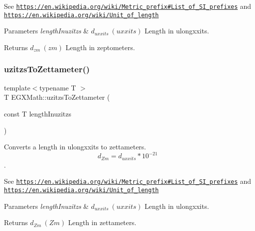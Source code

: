 See \href{https://en.wikipedia.org/wiki/Metric_prefix#List_of_SI_prefixes}{\tt https\+://en.\+wikipedia.\+org/wiki/\+Metric\+\_\+prefix\#\+List\+\_\+of\+\_\+\+S\+I\+\_\+prefixes} and \href{https://en.wikipedia.org/wiki/Unit_of_length}{\tt https\+://en.\+wikipedia.\+org/wiki/\+Unit\+\_\+of\+\_\+length} 
\begin{DoxyParams}{Parameters}
{\em length\+Inuzitzs} & $ d_{uxxits}\ (uxxits)$ Length in ulongxxits. \\
\hline
\end{DoxyParams}
\begin{DoxyReturn}{Returns}
$ d_{zm}\ (zm)$ Length in zeptometers. 
\end{DoxyReturn}
\mbox{\label{group___e_g_x_math-_conversions-_length_conversions-uzitzs-_s_i_ga43f793911855da08c6649eb9b059d9c2}} 
\subsubsection{\texorpdfstring{uzitzs\+To\+Zettameter()}{uzitzsToZettameter()}}
{\footnotesize\ttfamily template$<$typename T $>$ \\
T E\+G\+X\+Math\+::uzitzs\+To\+Zettameter (\begin{DoxyParamCaption}\item[{const T}]{length\+Inuzitzs }\end{DoxyParamCaption})}



Converts a length in ulongxxits to zettameters. \[ d_{Zm}=d_{uxxits} * 10^{-21} \]. 

See \href{https://en.wikipedia.org/wiki/Metric_prefix#List_of_SI_prefixes}{\tt https\+://en.\+wikipedia.\+org/wiki/\+Metric\+\_\+prefix\#\+List\+\_\+of\+\_\+\+S\+I\+\_\+prefixes} and \href{https://en.wikipedia.org/wiki/Unit_of_length}{\tt https\+://en.\+wikipedia.\+org/wiki/\+Unit\+\_\+of\+\_\+length} 
\begin{DoxyParams}{Parameters}
{\em length\+Inuzitzs} & $ d_{uxxits}\ (uxxits)$ Length in ulongxxits. \\
\hline
\end{DoxyParams}
\begin{DoxyReturn}{Returns}
$ d_{Zm}\ (Zm)$ Length in zettameters. 
\end{DoxyReturn}
